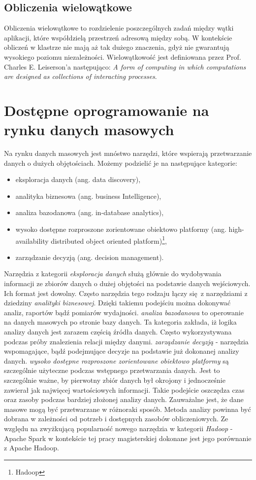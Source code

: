 \subsection{Obliczenia wielowątkowe}
Obliczenia wielowątkowe to rozdzielenie poszczególnych zadań między wątki aplikacji, które współdzielą przestrzeń adresową między sobą. W kontekście obliczeń w klastrze nie mają aż tak dużego znaczenia, gdyż nie gwarantują wysokiego poziomu niezależności. Wielowątkowość jest definiowana przez Prof. Charles E. Leiserson'a następująco: 
\newline \textit{A form of computing in which computations are designed as collections of interacting processes}\cite{mit_presentation}.
\section{Dostępne oprogramowanie na rynku danych masowych}
Na rynku danych masowych jest mnóstwo narzędzi, które wspierają przetwarzanie danych o dużych objętościach. Możemy podzielić je na następujące kategorie:
\begin{itemize}
	\item eksploracja danych (ang. data discovery),
	\item analityka biznesowa (ang. business Intelligence),
	\item analiza bazodanowa (ang. in-database analytics),
	\item wysoko dostępne rozproszone zorientowane obiektowo platformy (ang. high-availability distributed	object oriented platform)\footnote{Hadoop},
	\item zarządzanie decyzją (ang. decision management).    
\end{itemize}
Narzędzia z kategorii \textit{eksploracja danych} służą głównie do wydobywania informacji ze zbiorów danych o dużej objętości na podstawie danych wejściowych. Ich format jest dowolny. Często narzędzia tego rodzaju łączy się z narzędziami z dziedziny \textit{analityki biznesowej}. Dzięki takiemu podejściu można dokonywać analiz, raportów bądź pomiarów wydajności. \textit{analiza bazodanowa} to operowanie na danych masowych po stronie bazy danych. Ta kategoria zakłada, iż logika analizy danych jest zarazem częścią źródła danych. Często wykorzystywana podczas próby znalezienia relacji między danymi. \textit{zarządzanie decyzją} - narzędzia wspomagające, bądź podejmujące decyzje na podstawie już dokonanej analizy danych. \textit{wysoko dostępne rozproszone zorientowane obiektowo platformy} są szczególnie użyteczne podczas wstępnego przetwarzania danych. Jest to szczególnie ważne, by pierwotny zbiór danych był okrojony i jednocześnie zawierał jak najwięcej wartościowych informacji. Takie podejście oszczędza czas oraz zasoby podczas bardziej złożonej analizy danych\cite{big_data_tools}.
\newline Zauważalne jest, że dane masowe mogą być przetwarzane w różnoraki sposób. Metoda analizy powinna być dobrana w zależności od potrzeb i dostępnych zasobów obliczeniowych. Ze względu na zwyżkującą popularność nowego narzędzia w kategorii \textit{Hadoop} - Apache Spark w kontekście tej pracy magisterskiej dokonane jest jego porównanie z Apache Hadoop\cite{databricks_survey}.  
